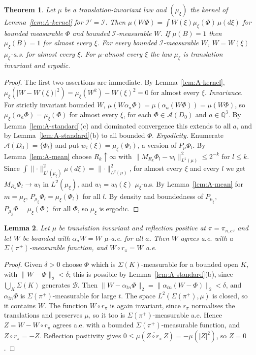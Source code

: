 \documentclass[11pt]{amsart}
\theoremstyle{plain}
\newtheorem{theorem}{Theorem}[section]
\newtheorem{lemma}[theorem]{Lemma}
\theoremstyle{definition}
\theoremstyle{remark}
\numberwithin{equation}{section}
\newcommand{\Q}{\mathbb{Q}}
\newcommand{\cA}{\mathcal{A}}
\newcommand{\cB}{\mathcal{B}}
\newcommand{\cI}{\mathcal{I}}
\newcommand{\abs}[1]{\lvert #1\rvert}
\newcommand{\norm}[1]{\lVert #1\rVert}
\begin{document}
\begin{theorem}\label{thm:A-decomp}
Let $\mu$ be a translation-invariant law and $(\mu_\xi)$ the kernel of Lemma~\ref{lem:A-kernel} for $\cI'=\cI$. Then $\mu(W\Phi)=\int W(\xi)\mu_\xi(\Phi)\,\mu(d\xi)$ for bounded measurable $\Phi$ and bounded $\cI$-measurable $W$. If $\mu(B)=1$ then $\mu_\xi(B)=1$ for almost every $\xi$. For every bounded $\cI$-measurable $W$, $W=W(\xi)$ $\mu_\xi$-a.s. for almost every $\xi$. For $\mu$-almost every $\xi$ the law $\mu_\xi$ is translation invariant and ergodic.
\end{theorem}

\begin{proof}
The first two assertions are immediate. By Lemma~\ref{lem:A-kernel}, $\mu_\xi(\abs{W-W(\xi)}^2)=\mu_\xi(W^2)-W(\xi)^2=0$ for almost every $\xi$.
\emph{Invariance.} For strictly invariant bounded $W$, $\mu(W\alpha_a\Phi)=\mu(\alpha_a(W\Phi))=\mu(W\Phi)$, so $\mu_\xi(\alpha_a\Phi)=\mu_\xi(\Phi)$ for almost every $\xi$, for each $\Phi\in\cA(D_0)$ and $a\in\Q^3$. By Lemma~\ref{lem:A-standard}(c) and dominated convergence this extends to all $a$, and by Lemma~\ref{lem:A-standard}(b) to all bounded $\Phi$.
\emph{Ergodicity.} Enumerate $\cA(D_0)=\{\Phi_l\}$ and put $w_l(\xi)=\mu_\xi(\Phi_l)$, a version of $P_\mu\Phi_l$. By Lemma~\ref{lem:A-mean} choose $R_k\uparrow\infty$ with $\norm{M_{R_k}\Phi_l-w_l}^2_{L^2(\mu)}\le2^{-k}$ for $l\le k$. Since $\int\norm\cdot^2_{L^2(\mu_\xi)}\mu(d\xi)=\norm\cdot^2_{L^2(\mu)}$, for almost every $\xi$ and every $l$ we get $M_{R_k}\Phi_l\to w_l$ in $L^2(\mu_\xi)$, and $w_l=w_l(\xi)$ $\mu_\xi$-a.s. By Lemma~\ref{lem:A-mean} for $m=\mu_\xi$, $P_{\mu_\xi}\Phi_l=\mu_\xi(\Phi_l)$ for all $l$. By density and boundedness of $P_{\mu_\xi}$, $P_{\mu_\xi}\Phi=\mu_\xi(\Phi)$ for all $\Phi$, so $\mu_\xi$ is ergodic.
\end{proof}

\begin{lemma}\label{lem:A-weights}
Let $\mu$ be translation invariant and reflection positive at $\pi=\pi_{n,c}$, and let $W$ be bounded with $\alpha_aW=W$ $\mu$-a.e. for all $a$. Then $W$ agrees a.e. with a $\Sigma(\pi^+)$-measurable function, and $W\circ r_\pi=W$ a.e.
\end{lemma}

\begin{proof}
Given $\delta>0$ choose $\Phi$ which is $\Sigma(K)$-measurable for a bounded open $K$, with $\norm{W-\Phi}_2<\delta$; this is possible by Lemma~\ref{lem:A-standard}(b), since $\bigcup_K\Sigma(K)$ generates $\cB$. Then $\norm{W-\alpha_{tn}\Phi}_2=\norm{\alpha_{tn}(W-\Phi)}_2<\delta$, and $\alpha_{tn}\Phi$ is $\Sigma(\pi^+)$-measurable for large $t$. The space $L^2(\Sigma(\pi^+),\mu)$ is closed, so it contains $W$. The function $W\circ r_\pi$ is again invariant, since $r_\pi$ normalises the translations and preserves $\mu$, so it too is $\Sigma(\pi^+)$-measurable a.e. Hence $Z=W-W\circ r_\pi$ agrees a.e. with a bounded $\Sigma(\pi^+)$-measurable function, and $Z\circ r_\pi=-Z$. Reflection positivity gives $0\le\mu(\overline{Z\circ r_\pi}\,Z)=-\mu(\abs Z^2)$, so $Z=0$.
\end{proof}
\end{document}
